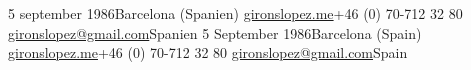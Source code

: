 \ifswedish
    {5 september 1986}{Barcelona (Spanien)}
    {\href{http://gironslopez.me}{gironslopez.me}}{+46 (0) 70-712 32 80}
    {\href{mailto:gironslopez@gmail.com}{gironslopez@gmail.com}}{Spanien}
\else
    {5 September 1986}{Barcelona (Spain)}
    {\href{http://gironslopez.me}{gironslopez.me}}{+46 (0) 70-712 32 80}
    {\href{mailto:gironslopez@gmail.com}{gironslopez@gmail.com}}{Spain}
\fi
